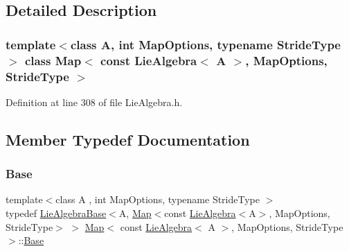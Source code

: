 \subsection{Detailed Description}
\subsubsection*{template$<$class A, int Map\+Options, typename Stride\+Type$>$\newline
class Map$<$ const Lie\+Algebra$<$ A $>$, Map\+Options, Stride\+Type $>$}



Definition at line 308 of file Lie\+Algebra.\+h.



\subsection{Member Typedef Documentation}
\hypertarget{class_map_3_01const_01_lie_algebra_3_01_a_01_4_00_01_map_options_00_01_stride_type_01_4_a166824ba02315d6ccc6f2eda82c268f6}{}\label{class_map_3_01const_01_lie_algebra_3_01_a_01_4_00_01_map_options_00_01_stride_type_01_4_a166824ba02315d6ccc6f2eda82c268f6} 
\subsubsection{\texorpdfstring{Base}{Base}}
{\footnotesize\ttfamily template$<$class A , int Map\+Options, typename Stride\+Type $>$ \\
typedef \hyperlink{class_lie_algebra_base}{Lie\+Algebra\+Base}$<$A, \hyperlink{class_map_3_01const_01_lie_algebra_3_01_a_01_4_00_01_map_options_00_01_stride_type_01_4_a1f3c2cd540feb372191254760225bf1a}{Map}$<$const \hyperlink{class_lie_algebra}{Lie\+Algebra}$<$A$>$, Map\+Options, Stride\+Type$>$ $>$ \hyperlink{class_map_3_01const_01_lie_algebra_3_01_a_01_4_00_01_map_options_00_01_stride_type_01_4_a1f3c2cd540feb372191254760225bf1a}{Map}$<$ const \hyperlink{class_lie_algebra}{Lie\+Algebra}$<$ A $>$, Map\+Options, Stride\+Type $>$\+::\hyperlink{class_map_3_01const_01_lie_algebra_3_01_a_01_4_00_01_map_options_00_01_stride_type_01_4_a166824ba02315d6ccc6f2eda82c268f6}{Base}\hspace{0.3cm}{\ttfamily [protected]}}

